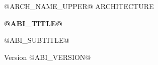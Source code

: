 \begin{titlepage}
\centering
\vspace*{0.75in}
{\Large @ARCH_NAME_UPPER@ ARCHITECTURE\par}
\vspace{0.25in}
{\Huge\bfseries @ABI_TITLE@\par}
\vspace{0.30in}
{\large @ABI_SUBTITLE@\par}
\vspace{0.20in}
{\large Version @ABI_VERSION@\par}
\vfill
\end{titlepage}
\tableofcontents
\clearpage
\listoftables
\clearpage
{}
